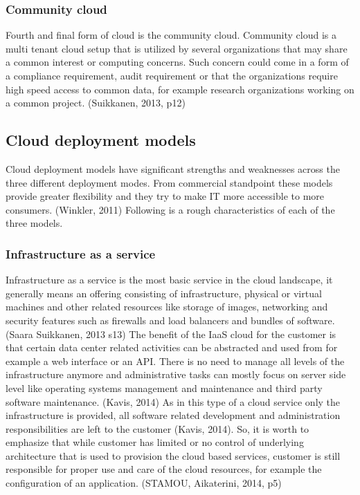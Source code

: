 \documentclass{article}
\begin{document}
\subsubsection{Community cloud}
Fourth and final form of cloud is the community cloud. Community cloud is a multi tenant cloud setup that is utilized by several organizations that may share a common interest or computing concerns. Such concern could come in a form of a compliance requirement, audit requirement or that the organizations require high speed access to common data, for example research organizations working on a common project. (Suikkanen, 2013, p12)
\subsection{Cloud deployment models}
Cloud deployment models have significant strengths and weaknesses across the three different deployment modes. From commercial standpoint these models provide greater flexibility and they try to make IT more accessible to more consumers. (Winkler, 2011) Following is a rough characteristics of each of the three models.
\subsubsection{Infrastructure as a service}
Infrastructure as a service is the most basic service in the cloud landscape, it generally means an offering consisting of infrastructure, physical or virtual machines and other related resources like storage of images, networking and security features such as firewalls and load balancers and bundles of software. (Saara Suikkanen, 2013 s13)
The benefit of the IaaS cloud for the customer is that certain data center related activities can be abstracted and used from for example a web interface or an API. There is no need to manage all levels of the infrastructure anymore and administrative tasks can mostly focus on server side level like operating systems management and maintenance and third party software maintenance. (Kavis, 2014)
As in this type of a cloud service only the infrastructure is provided, all software related development and administration responsibilities are left to the customer (Kavis, 2014).
So, it is worth to emphasize that while customer has limited or no control of underlying architecture that is used to provision the cloud based services, customer is still responsible for proper use and care of the cloud resources, for example the configuration of an application. (STAMOU, Aikaterini, 2014, p5)
\end{document}

